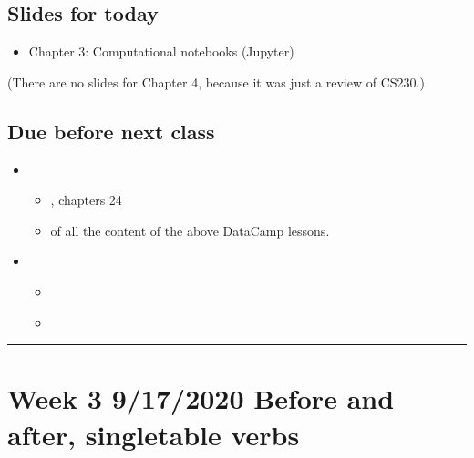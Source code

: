 \documentclass[letterpaper,10pt,english]{sphinxmanual}
\begin{document}
\subsection{Slides for today}
\label{\detokenize{course-schedule:id1}}\begin{itemize}
\item {} 
Chapter 3: Computational notebooks (Jupyter)

\end{itemize}

(There are no slides for Chapter 4, because it was just a review of CS230.)


\subsection{Due before next class}
\label{\detokenize{course-schedule:id2}}\begin{itemize}
\item {} 
\begin{itemize}
\item {} 
, chapters 2\sphinxhyphen{}4

\item {} 
 of all the content of the above DataCamp lessons.

\end{itemize}

\item {} 
\begin{itemize}
\item {} 
{\hyperref[\detokenize{chapter-5-before-and-after::doc}]{}}

\item {} 
{\hyperref[\detokenize{chapter-6-single-table-verbs::doc}]{}}

\end{itemize}

\end{itemize}


\bigskip\hrule\bigskip



\section{Week 3 \sphinxhyphen{} 9/17/2020 \sphinxhyphen{} Before and after, single\sphinxhyphen{}table verbs}
\label{\detokenize{course-schedule:week-3-9-17-2020-before-and-after-single-table-verbs}}
\end{document}
